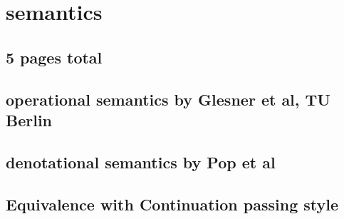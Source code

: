\chapter*{semantics}


\section{5 pages total}
\section{operational semantics by Glesner et al, TU Berlin}
\section{denotational semantics by Pop et al}
\section{Equivalence with Continuation passing style}




